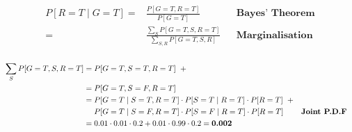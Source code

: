 \begin{equation*}
\begin{aligned}
P[R = T \mid G = T] ={} & \frac{P[G = T, R = T]}{P[G = T]} && \textbf{Bayes' Theorem} \\[3mm]
							  ={} & \frac{\sum_{S} P[G = T, S, R = T]}{\sum_{S,R} P[G = T, S, R]} && \textbf{Marginalisation} \\[3mm]
\end{aligned}
\end{equation*}

\begin{equation*}
\begin{aligned}
\sum_{S} P[G = T, S, R = T] ={} &  P[G = T, S = T, R = T] \hspace{2mm} +  \\
										  ={} &  P[G = T, S = F, R = T] \\
							 			  ={} & P[G = T \mid S = T, R = T] \cdot P[S = T \mid R = T] \cdot P[R = T ]  \hspace{2mm}+ \\
							 			    {} & P[G = T \mid S = F, R = T] \cdot P[S = F \mid R = T] \cdot P[R = T] && \textbf{Joint P.D.F} \\
							 			  ={} & 0.01 \cdot 0.01 \cdot 0.2 + 0.01 \cdot 0.99 \cdot 0.2
							 			  ={} \textbf{0.002}
\end{aligned}
\end{equation*}

